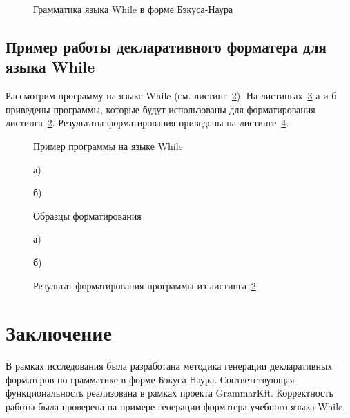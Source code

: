 \documentclass[conference]{IEEEtran}
\begin{document}
\begin{figure}[h]
	\centering
	
	\caption{Грамматика языка While в форме Бэкуса-Наура}
	\label{whileBnf}
\end{figure}

\subsection{Пример работы декларативного форматера для языка While}
Рассмотрим программу на языке While (см. листинг~\ref{whileProg}).
На листингах~\ref{whileTs} а и б приведены программы, которые будут использованы для форматирования листинга~\ref{whileProg}.
Результаты форматирования приведены на листинге~\ref{whileRes}.

\begin{figure}[h]
	\centering
	
	\caption{Пример программы на языке While}
	\label{whileProg}
\end{figure}

\begin{figure}[ht]
\noindent\begin{minipage}{.2\textwidth}
    
\caption*{а)}    
\end{minipage}\hfill
\begin{minipage}{.2\textwidth}
    
\caption*{б)}    
\end{minipage}
\caption{Образцы форматирования}    
\label{whileTs}
\end{figure}

\begin{figure}[ht]
\noindent\begin{minipage}{.2\textwidth}
    
\caption*{а)}    
\end{minipage}\hfill
\begin{minipage}{.2\textwidth}
    
\caption*{б)}    
\end{minipage}
\caption{Результат форматирования программы из листинга~\ref{whileProg}}
\label{whileRes}
\end{figure}

\section{Заключение}
В рамках исследования была разработана методика генерации декларативных форматеров по грамматике в форме Бэкуса-Наура.
Соответствующая функциональность реализована в рамках проекта GrammarKit.
Корректность работы была проверена на примере генерации форматера учебного языка While.
\end{document}
